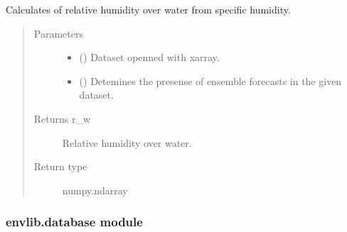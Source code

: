 \documentclass[a4paper,11pt,english]{sphinxmanual}
\begin{document}
\begin{fulllineitems}
\label{\detokenize{envlib:envlib.contrail.get_rw_from_specific_hum}}
\sphinxAtStartPar
Calculates of relative humidity over water from specific humidity.
\begin{quote}\begin{description}
\item[{Parameters}] \leavevmode\begin{itemize}
\item {} 
\sphinxAtStartPar
{} () \textendash{} Dataset openned with xarray.

\item {} 
\sphinxAtStartPar
{} () \textendash{} Detemines the presense of ensemble forecasts in the given dataset.

\end{itemize}

\item[{Returns r\_w}] \leavevmode
\sphinxAtStartPar
Relative humidity over water.

\item[{Return type}] \leavevmode
\sphinxAtStartPar
numpy.ndarray

\end{description}\end{quote}

\end{fulllineitems}


\begin{fulllineitems}
\label{\detokenize{envlib:envlib.contrail.potential_con_cir_cov}}
\end{fulllineitems}



\subsubsection{envlib.database module}
\label{\detokenize{envlib:module-envlib.database}}\label{\detokenize{envlib:envlib-database-module}}
\end{document}
